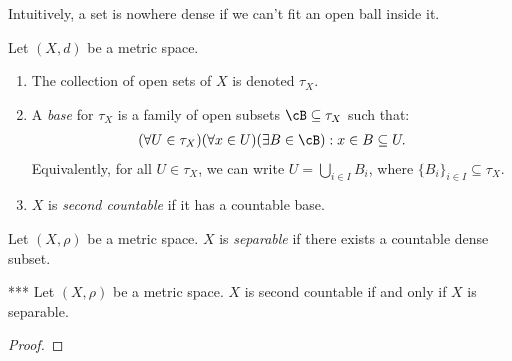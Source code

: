     Intuitively, a set is nowhere dense if we can't fit an open ball inside it.

    \begin{definition}
        Let $(X,d)$ be a metric space. 
        \begin{enumerate}[label = (\arabic*),itemsep=1pt,topsep=3pt]
            \item The collection of open sets of $X$ is denoted $\tau_X$.
            \item A \textit{base} for $\tau_X$ is a family of open subsets $\cB \subseteq \tau_X$ such that:
                \begin{equation*}
                \begin{split}
                    (\forall U \in \tau_X)(\forall x\in U)(\exists B \in \cB):x \in B \subseteq U.
                \end{split}
                \end{equation*}
            Equivalently, for all $U \in \tau_X$, we can write $U = \bigcup_{i \in I}B_i$, where $\{B_i\}_{i \in I} \subseteq \tau_X$.

            \item $X$ is \textit{second countable} if it has a countable base.
        \end{enumerate}
    \end{definition}

    \begin{definition}
        Let $(X,\rho)$ be a metric space. $X$ is \textit{separable} if there exists a countable dense subset.
    \end{definition}

    \begin{proposition}***
        Let $(X,\rho)$ be a metric space. $X$ is second countable if and only if $X$ is separable.
    \end{proposition}
        \begin{proof}
            
        \end{proof}

    


